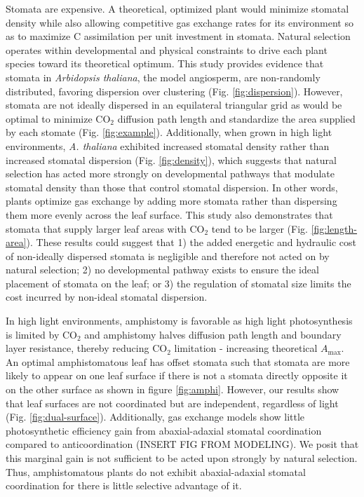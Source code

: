 \documentclass[12pt,halfline,a4paper,]{ouparticle}
\begin{document}
Stomata are expensive. A theoretical, optimized plant would minimize
stomatal density while also allowing competitive gas exchange rates for
its environment so as to maximize C assimilation per unit investment in
stomata. Natural selection operates within developmental and physical
constraints to drive each plant species toward its theoretical optimum.
This study provides evidence that stomata in \emph{Arbidopsis thaliana},
the model angiosperm, are non-randomly distributed, favoring dispersion
over clustering (Fig. \ref{fig:dispersion}). However, stomata are not
ideally dispersed in an equilateral triangular grid as would be optimal
to minimize CO\(_2\) diffusion path length and standardize the area
supplied by each stomate (Fig. \ref{fig:example}). Additionally, when
grown in high light environments, \emph{A. thaliana} exhibited increased
stomatal density rather than increased stomatal dispersion (Fig.
\ref{fig:density}), which suggests that natural selection has acted more
strongly on developmental pathways that modulate stomatal density than
those that control stomatal dispersion. In other words, plants optimize
gas exchange by adding more stomata rather than dispersing them more
evenly across the leaf surface. This study also demonstrates that
stomata that supply larger leaf areas with CO\(_2\) tend to be larger
(Fig. \ref{fig:length-area}). These results could suggest that 1) the
added energetic and hydraulic cost of non-ideally dispersed stomata is
negligible and therefore not acted on by natural selection; 2) no
developmental pathway exists to ensure the ideal placement of stomata on
the leaf; or 3) the regulation of stomatal size limits the cost incurred
by non-ideal stomatal dispersion.

In high light environments, amphistomy is favorable as high light
photosynthesis is limited by CO\(_2\) and amphistomy halves diffusion
path length and boundary layer resistance, thereby reducing CO\(_2\)
limitation - increasing theoretical \(A_\text{max}\). An optimal
amphistomatous leaf has offset stomata such that stomata are more likely
to appear on one leaf surface if there is not a stomata directly
opposite it on the other surface as shown in figure \ref{fig:amphi}.
However, our results show that leaf surfaces are not coordinated but are
independent, regardless of light (Fig. \ref{fig:dual-surface}).
Additionally, gas exchange models show little photosynthetic efficiency
gain from abaxial-adaxial stomatal coordination compared to
anticoordination (INSERT FIG FROM MODELING). We posit that this marginal
gain is not sufficient to be acted upon strongly by natural selection.
Thus, amphistomatous plants do not exhibit abaxial-adaxial stomatal
coordination for there is little selective advantage of it.
\end{document}
